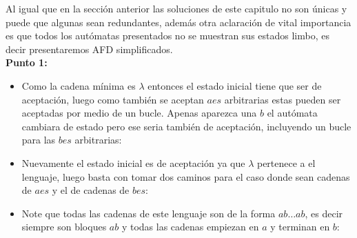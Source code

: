 Al igual que en la sección anterior las soluciones de este capitulo no son únicas y puede que algunas sean redundantes, además otra aclaración de vital importancia es que todos los autómatas presentados no se muestran sus estados limbo, es decir presentaremos AFD simplificados.\\

\textbf{Punto 1:}
\begin{itemize}[label={✎}]
    \item Como la cadena mínima es $\lambda$ entonces el estado inicial tiene que ser de aceptación, luego como también se aceptan $aes$ arbitrarias estas pueden ser aceptadas por medio de un bucle. Apenas aparezca una $b$ el autómata cambiara de estado pero ese seria también de aceptación, incluyendo un bucle para las $bes$ arbitrarias:\\
    \begin{center}
    \end{center}

    \item Nuevamente el estado inicial es de aceptación ya que $\lambda$ pertenece a el lenguaje, luego basta con tomar dos caminos para el caso donde sean cadenas de $aes$ y el de cadenas de $bes$:
    \begin{center}
    \end{center}

    \item Note que todas las cadenas de este lenguaje son de la forma $ab\dots ab$, es decir siempre son bloques $ab$ y todas las cadenas empiezan en $a$ y terminan en $b$:
    \begin{center}
    \end{center}


\end{itemize}
